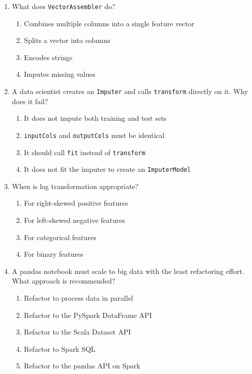 \documentclass[11pt]{article}
\begin{document}
\begin{enumerate}[leftmargin=*, label=\textbf{Q\arabic*.}, start=39]
		\item What does \texttt{VectorAssembler} do?
		\begin{enumerate}[label=(\alph*)]
			\item Combines multiple columns into a single feature vector
			\item Splits a vector into columns
			\item Encodes strings
			\item Imputes missing values
		\end{enumerate}
		
		\item A data scientist creates an \texttt{Imputer} and calls \texttt{transform} directly on it. Why does it fail?
		\begin{enumerate}[label=(\alph*)]
			\item It does not impute both training and test sets
			\item \texttt{inputCols} and \texttt{outputCols} must be identical
			\item It should call \texttt{fit} instead of \texttt{transform}
			\item It does not fit the imputer to create an \texttt{ImputerModel}
		\end{enumerate}
		
		\item When is log transformation appropriate?
		\begin{enumerate}[label=(\alph*)]
			\item For right-skewed positive features
			\item For left-skewed negative features
			\item For categorical features
			\item For binary features
		\end{enumerate}
		
		\item A pandas notebook must scale to big data with the least refactoring effort. What approach is recommended?
		\begin{enumerate}[label=(\alph*)]
			\item Refactor to process data in parallel
			\item Refactor to the PySpark DataFrame API
			\item Refactor to the Scala Dataset API
			\item Refactor to Spark SQL
			\item Refactor to the pandas API on Spark
		\end{enumerate}
		

\end{enumerate}
\end{document}
